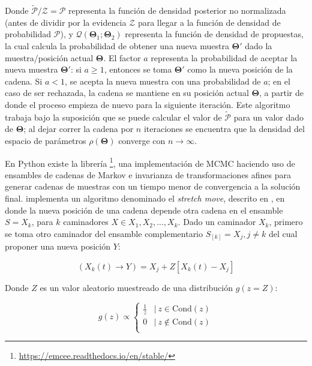 Donde $\tilde{\mathcal{P}}/\mathcal{Z} = \mathcal{P}$ representa la función de
densidad posterior no normalizada (antes de dividir por la evidencia
$\mathcal{Z}$ para llegar a la función de densidad de probabilidad
$\mathcal{P}$), y $\mathcal{Q}(\mathbf{\Theta}_1 ; \mathbf{\Theta}_2)$
representa la función de densidad de propuestas, la cual calcula la probabilidad
de obtener una nueva muestra $\mathbf{\Theta}'$ dado la muestra/posición actual
$\mathbf{\Theta}$. El factor $a$ representa la probabilidad de aceptar la nueva
muestra $\mathbf{\Theta}'$: si $a \geq 1$, entonces se toma $\mathbf{\Theta}'$
como la nueva posición de la cadena. Si $a <1$, se acepta la nueva muestra con
una probabilidad de $a$; en el caso de ser rechazada, la cadena se mantiene en
su posición actual $\mathbf{\Theta}$, a partir de donde el proceso empieza de
nuevo para la siguiente iteración. Este algoritmo trabaja bajo la suposición que
se puede calcular el valor de $\tilde{\mathcal{P}}$ para un valor dado de
$\mathbf{\Theta}$; al dejar correr la cadena por $n$ iteraciones se encuentra
que la densidad del espacio de parámetros $\rho(\mathbf{\Theta})$ converge con
$n \rightarrow \infty$.

En Python existe la librería
\footnote{\url{https://emcee.readthedocs.io/en/stable/}}, una
implementación de MCMC haciendo uso de ensambles de cadenas de Markov e
invarianza de transformaciones afines para generar cadenas de muestras con un
tiempo menor de convergencia a la solución final.  implementa un
algoritmo denominado el \textit{stretch move}, descrito en
,
en donde la nueva posición de una cadena depende otra cadena en el ensamble $S =
{X_k}$, para $k$ caminadores $X \in {X_1, X_2, ..., X_k}$. Dado un caminador
$X_k$, primero se toma otro caminador del ensamble complementario $S_{[k]} =
{X_j, j \neq k}$ del cual proponer una nueva posición $Y$:

\newpage

\begin{eqfloat}[!ht]
	\centering
	\begin{equation}
		(X_{k}(t) \rightarrow Y) = X_j + Z[X_{k}(t) - X_j]
	\end{equation}
\end{eqfloat}

Donde $Z$ es un valor aleatorio muestreado de una distribución $g(z = Z)$:

\begin{eqfloat}[!ht]
	\centering
	\begin{equation}
		g(z) \propto \left\{\begin{matrix}
			\frac{1}{z} & | \ z \in \mathrm{Cond}(z) \\
			0 &| \ z \notin \mathrm{Cond}(z) \\
			\end{matrix}\right.
	\end{equation}
\end{eqfloat}

